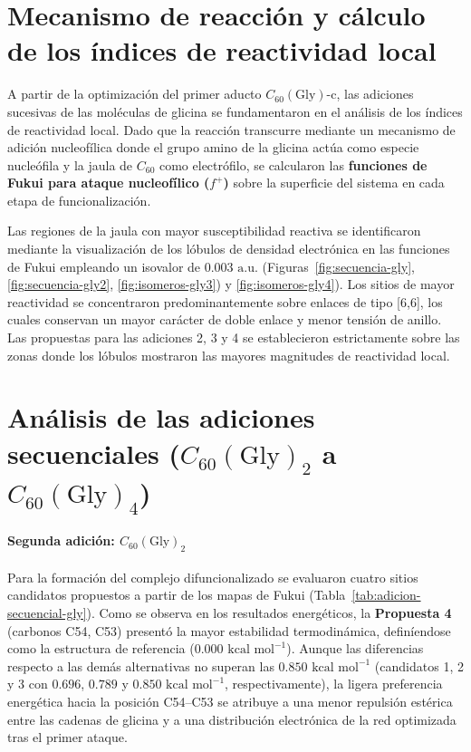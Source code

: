     
 \section{Mecanismo de reacción y cálculo de los índices de reactividad local}

A partir de la optimización del primer aducto $C_{60}(\text{Gly})\text{-c}$, las adiciones sucesivas de las moléculas de glicina se fundamentaron en el análisis de los índices de reactividad local. Dado que la reacción transcurre mediante un mecanismo de adición nucleofílica donde el grupo amino de la glicina actúa como especie nucleófila y la jaula de $C_{60}$ como electrófilo, se calcularon las \textbf{funciones de Fukui para ataque nucleofílico ($f^+$)} sobre la superficie del sistema en cada etapa de funcionalización.

Las regiones de la jaula con mayor susceptibilidad reactiva se identificaron mediante la visualización de los lóbulos de densidad electrónica en las funciones de Fukui empleando un isovalor de $0.003\text{ a.u.}$ (Figuras~\ref{fig:secuencia-gly}, \ref{fig:secuencia-gly2}, \ref{fig:isomeros-gly3}) y \ref{fig:isomeros-gly4}). Los sitios de mayor reactividad se concentraron predominantemente sobre enlaces de tipo [6,6], los cuales conservan un mayor carácter de doble enlace y menor tensión de anillo. Las propuestas para las adiciones 2, 3 y 4 se establecieron estrictamente sobre las zonas donde los lóbulos mostraron las mayores magnitudes de reactividad local.

\section{Análisis de las adiciones secuenciales ($C_{60}(\text{Gly})_2$ a $C_{60}(\text{Gly})_4$)}

\paragraph{Segunda adición: $C_{60}(\text{Gly})_2$}
Para la formación del complejo difuncionalizado se evaluaron cuatro sitios candidatos propuestos a partir de los mapas de Fukui (Tabla~\ref{tab:adicion-secuencial-gly}). Como se observa en los resultados energéticos, la \textbf{Propuesta 4} (carbonos C54, C53) presentó la mayor estabilidad termodinámica, definíendose como la estructura de referencia ($0.000\text{ kcal mol}^{-1}$). Aunque las diferencias respecto a las demás alternativas no superan las $0.850\text{ kcal mol}^{-1}$ (candidatos 1, 2 y 3 con $0.696$, $0.789$ y $0.850\text{ kcal mol}^{-1}$, respectivamente), la ligera preferencia energética hacia la posición C54--C53 se atribuye a una menor repulsión estérica entre las cadenas de glicina y a una distribución electrónica de la red optimizada tras el primer ataque.

